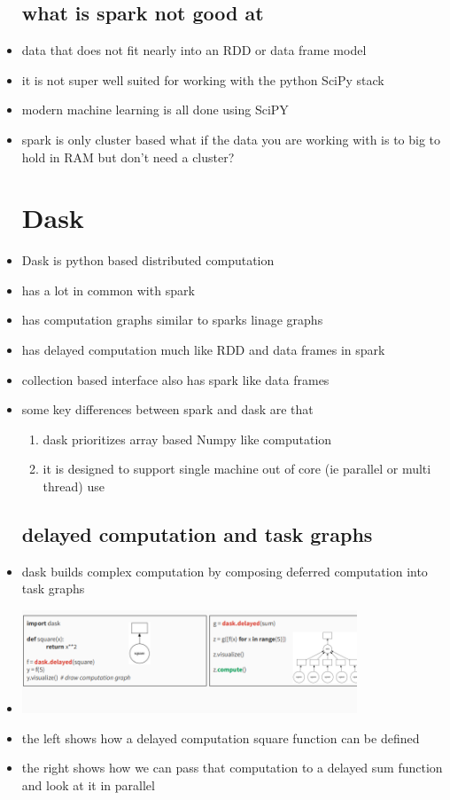\documentclass{article}
\begin{document}
\begin{itemize}
\subsection*{what is spark not good at}
\item data that does not fit nearly into an RDD or data frame model 
\item it is not super well suited for working with the python SciPy stack 
\item modern machine learning is all done using SciPY 
\item spark is only cluster based what if the data you are working with is to big to hold in RAM but don't need a cluster? 
\section*{Dask}
\item Dask is python based distributed computation 
\item has a lot in common with spark 
\item has computation graphs similar to sparks linage graphs 
\item has delayed computation much like RDD and data frames in spark 
\item collection based interface also has spark like data frames 
\item some key differences between spark and dask are that 
\begin{enumerate}
    \item dask prioritizes array based Numpy like computation 
    \item it is designed to support single machine out of core (ie parallel or multi thread) use
\end{enumerate}
\subsection*{delayed computation and task graphs}
\item dask builds complex computation by composing deferred  computation into task graphs 
\item \includegraphics*[width=10cm]{images/Screenshot Capture - 2023-05-10 - 17-55-10.png}
\item the left shows how a delayed computation square function can be defined 
\item the right shows how we can pass that computation to a delayed sum function and look at it in parallel

\end{itemize}
\end{document}
